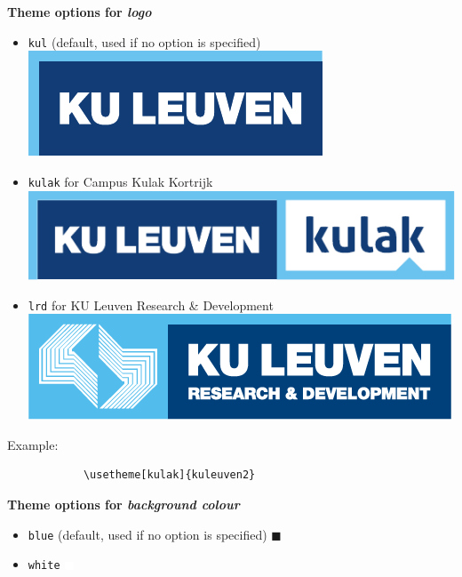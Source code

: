 \documentclass{beamer}
\begin{document}
\begin{frame}[t,fragile]
\begin{columns}[T,totalwidth=\textwidth]
\begin{column}{.48\textwidth}
	\vspace{24pt}
	\begin{block}{\bfseries Theme options for \emph{logo}}
		\begin{itemize}
			\item \texttt{kul} \qquad (default, used if no option is specified) \includegraphics[height=.02\paperheight]{graphics/KUL.pdf}
			\item \texttt{kulak} \quad for Campus Kulak Kortrijk \includegraphics[height=.02\paperheight]{graphics/KULAK.pdf}
			\item \texttt{lrd} \qquad for KU Leuven Research \& Development \includegraphics[height=.02\paperheight]{graphics/LRD.png}
			\end{itemize}
	
			\vspace{24pt}
			Example:
			\begin{verbatim}
			\usetheme[kulak]{kuleuven2}
			\end{verbatim}
	\end{block}

	
\vspace{24pt}
	\begin{block}{\bfseries Theme options for \emph{background colour}}

		\begin{itemize}
			\item \texttt{blue} \quad (default, used if no option is specified) \textcolor{kul-secblue}{\Large$\blacksquare$}
			\item \texttt{white} \textcolor{white}{\Large$\blacksquare$}
		\end{itemize}
		

\end{block}
\end{column}
\end{columns}
\end{frame}
\end{document}
